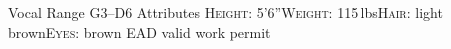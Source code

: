 \begin{cvskills}
  \cvskill
    {Vocal Range}%
    {G3--D6}%
  \cvskill
    {Attributes}%
    {{\scshape Height}: 5'6''{\enskip\cdotp\enskip}{\scshape Weight}: 115\,lbs{\enskip\cdotp\enskip}{\scshape Hair}: light brown{\enskip\cdotp\enskip}{\scshape Eyes}: brown}%
  \cvskill
    {EAD}
    {valid work permit}
\end{cvskills}
